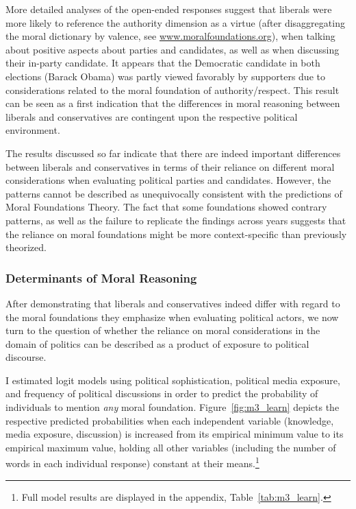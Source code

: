 \documentclass[12pt]{article}
\begin{document}
More detailed analyses of the open-ended responses suggest that liberals were more likely to reference the authority dimension as a virtue (after disaggregating the moral dictionary by valence, see \url{www.moralfoundations.org}), when talking about positive aspects about parties and candidates, as well as when discussing their in-party candidate. It appears that the Democratic candidate in both elections (Barack Obama) was partly viewed favorably by supporters due to considerations related to the moral foundation of authority/respect. This result can be seen as a first indication that the differences in moral reasoning between liberals and conservatives are contingent upon the respective political environment.

The results discussed so far indicate that there are indeed important differences between liberals and conservatives in terms of their reliance on different moral considerations when evaluating political parties and candidates. However, the patterns cannot be described as unequivocally consistent with the predictions of Moral Foundations Theory. The fact that some foundations showed contrary patterns, as well as the failure to replicate the findings across years suggests that the reliance on moral foundations might be more context-specific than previously theorized.


\subsubsection{Determinants of Moral Reasoning}

After demonstrating that liberals and conservatives indeed differ with regard to the moral foundations they emphasize when evaluating political actors, we now turn to the question of whether the reliance on moral considerations in the domain of politics can be described as a product of exposure to political discourse.

I estimated logit models using political sophistication, political media exposure, and frequency of political discussions in order to predict the probability of individuals to mention \textit{any} moral foundation. Figure~\ref{fig:m3_learn} depicts the respective predicted probabilities when each independent variable (knowledge, media exposure, discussion) is increased from its empirical minimum value to its empirical maximum value, holding all other variables (including the number of words in each individual response) constant at their means.\footnote{Full model results are displayed in the appendix, Table~\ref{tab:m3_learn}.}
\end{document}
